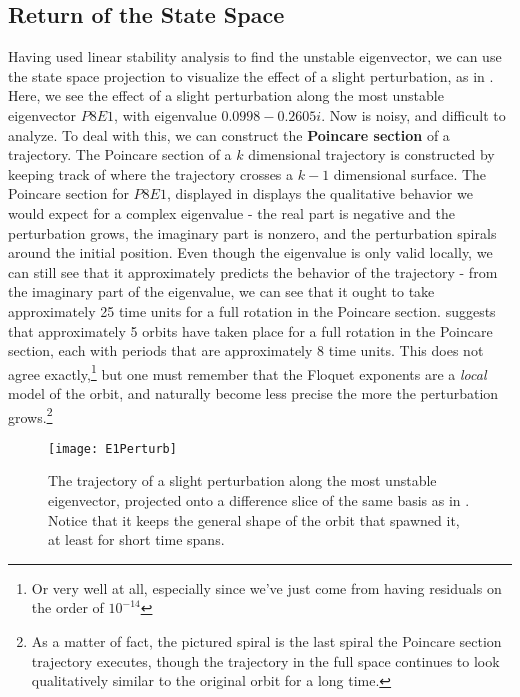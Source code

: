\subsection{Return of the State Space}

Having used linear stability analysis to find the unstable eigenvector, we can use the state space projection to visualize the effect of a slight perturbation, as  in . Here, we see the effect of a slight perturbation along the most unstable eigenvector $P8E1$, with eigenvalue $0.0998 - 0.2605 i$. Now  is noisy, and difficult to analyze. To deal with this, we can construct the {\bf Poincare section} of a trajectory. The Poincare section of a $k$ dimensional trajectory is constructed by keeping track of where the trajectory crosses a $k-1$ dimensional surface. The Poincare section for  $P8E1$, displayed in  displays the qualitative behavior we would expect for a complex eigenvalue - the real part is negative and the perturbation grows, the imaginary part is nonzero, and the perturbation spirals around the initial position. Even though the eigenvalue is only valid locally, we can still see that it approximately predicts the behavior of the trajectory - from the imaginary part of the eigenvalue, we can see that it ought to take approximately 25 time units for a full rotation in the Poincare section.  suggests that approximately 5 orbits have taken place for a full rotation in the Poincare section, each with periods that are approximately 8 time units. This does not agree exactly,\footnote{Or very well at all, especially since we've just come from having residuals on the order of $10^{-14}$} but one must remember that the Floquet exponents are a \emph{local} model of the orbit, and naturally become less precise the more the perturbation grows.\footnote{As a matter of fact, the pictured spiral is the last spiral the Poincare section trajectory executes, though the trajectory in the full space continues to look qualitatively similar to the original orbit for a long time.}   


\begin{figure}[h!]
\centerline{\texttt{[image: E1Perturb]}}
\caption{The trajectory of a slight perturbation along the most unstable eigenvector, projected onto a difference slice of the same basis as in . Notice that it keeps the general shape of the orbit that spawned it, at least for short time spans.}\label{fig:p8E1}
\end{figure}

